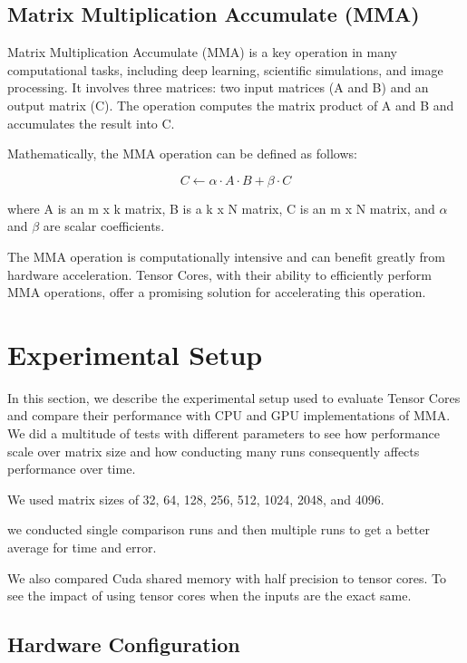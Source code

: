 \documentclass[conference]{IEEEtran}
\begin{document}
  \subsection{Matrix Multiplication Accumulate (MMA)}\label{sec:mma}
  
  Matrix Multiplication Accumulate (MMA) is a key operation in many computational tasks, including deep 
  learning, scientific simulations, and image processing. It involves three matrices: two input matrices 
  (A and B) and an output matrix (C). The operation computes the matrix product of A and B and accumulates 
  the result into C.
  
  Mathematically, the MMA operation can be defined as follows:
  
  \[ C \leftarrow \alpha \cdot A \cdot B + \beta \cdot C \]
  
  where A is an m x k matrix, B is a k x N matrix, C is an m x N matrix, and $\alpha$ and $\beta$ are scalar coefficients.
  
  The MMA operation is computationally intensive and can benefit greatly from hardware acceleration. 
  Tensor Cores, with their ability to efficiently perform MMA operations, offer a promising solution 
  for accelerating this operation.
  
  \section{Experimental Setup}\label{sec:experimental-setup}
  
  In this section, we describe the experimental setup used to evaluate 
  Tensor Cores and compare their performance with CPU and GPU implementations of MMA.
  We did a multitude of tests with different parameters to see how performance scale over matrix size
  and how conducting many runs consequently affects performance over time.

  We used matrix sizes of 32, 64, 128, 256, 512, 1024, 2048, and 4096.

  we conducted single comparison runs and then multiple runs to get a better average for time and error.
  
  We also compared Cuda shared memory with half precision to tensor cores. To see the impact of using tensor cores
  when the inputs are the exact same.

  \subsection{Hardware Configuration}\label{sec:hardware-configuration}
  
\end{document}
